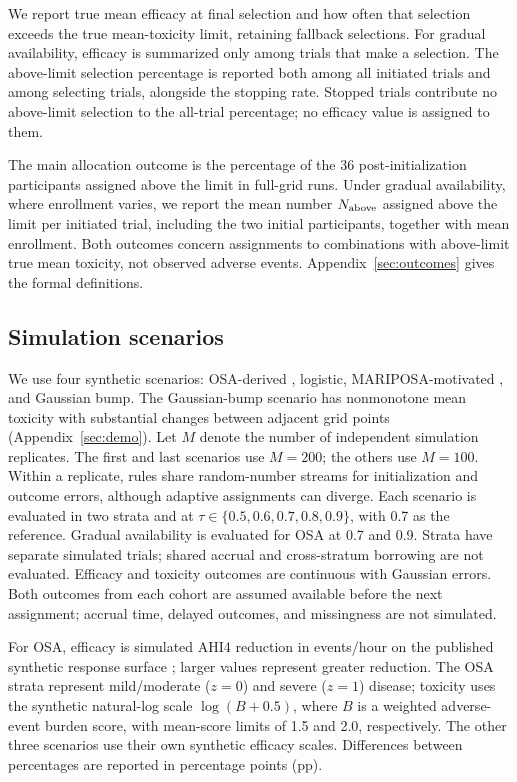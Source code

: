 \documentclass[11pt]{article}
\newcommand{\rev}[1]{{#1}}
\begin{document}
\rev{We report true mean efficacy at final selection and how often that selection exceeds the true mean-toxicity limit, retaining fallback selections. For gradual availability, efficacy is summarized only among trials that make a selection. The above-limit selection percentage is reported both among all initiated trials and among selecting trials, alongside the stopping rate. Stopped trials contribute no above-limit selection to the all-trial percentage; no efficacy value is assigned to them.}

\rev{The main allocation outcome is the percentage of the 36 post-initialization participants assigned above the limit in full-grid runs. Under gradual availability, where enrollment varies, we report the mean number $N_{\rm above}$ assigned above the limit per initiated trial, including the two initial participants, together with mean enrollment. Both outcomes concern assignments to combinations with above-limit true mean toxicity, not observed adverse events. Appendix~\ref{sec:outcomes} gives the formal definitions.}

\subsection{\rev{Simulation scenarios}}\label{sec:analysis}

We use four synthetic scenarios: OSA-derived \citep{willardobd}, logistic, MARIPOSA-motivated \citep{schweitzer2023}, and Gaussian bump. \rev{The Gaussian-bump scenario has nonmonotone mean toxicity with substantial changes between adjacent grid points (Appendix~\ref{sec:demo}).} \rev{Let $M$ denote the number of independent simulation replicates. The first and last scenarios use $M=200$; the others use $M=100$.} Within a replicate, rules share random-number streams for initialization and outcome errors, although adaptive assignments can diverge. \rev{Each scenario is evaluated in two strata and at $\tau\in\{0.5,0.6,0.7,0.8,0.9\}$, with 0.7 as the reference.} Gradual availability is evaluated for OSA at 0.7 and 0.9. Strata have separate simulated trials; \rev{shared accrual and cross-stratum borrowing are not evaluated}. \rev{Efficacy and toxicity outcomes are continuous with Gaussian errors.} Both outcomes from each cohort are assumed available before the next assignment; accrual time, delayed outcomes, and missingness are not simulated.

\rev{For OSA, efficacy is simulated AHI4 reduction in events/hour on the published synthetic response surface \citep{willardobd}; larger values represent greater reduction. The OSA strata represent mild/moderate ($z=0$) and severe ($z=1$) disease; toxicity uses the synthetic natural-log scale $\log(B+0.5)$, where $B$ is a weighted adverse-event burden score, with mean-score limits of 1.5 and 2.0, respectively. The other three scenarios use their own synthetic efficacy scales. Differences between percentages are reported in percentage points (pp).}
\end{document}
